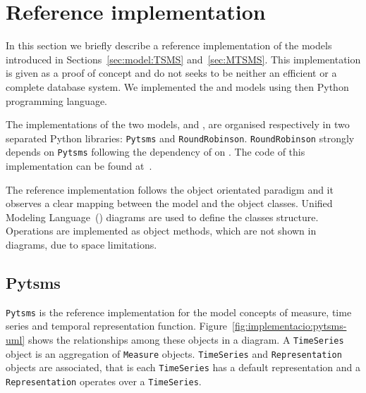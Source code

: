 \section{Reference implementation}
\label{sec:implementation}

In this section we briefly describe a reference implementation of the
models introduced in Sections~\ref{sec:model:TSMS}
and~\ref{sec:MTSMS}. This implementation is given as a proof of
concept and do not seeks to be neither an efficient or a complete database
system. We implemented the  and  models using
then Python~\cite{python:doc2} programming language.

The implementations of the two models,  and ,
are organised respectively in two separated Python libraries:
\texttt{Pytsms} and \texttt{RoundRobinson}.  \texttt{RoundRobinson}
strongly depends on \texttt{Pytsms} following the dependency of
 on .  The code of this implementation can be
found at~\cite{llusa:roundrobinson}.

The reference implementation follows the object orientated paradigm
and it observes a clear mapping between the model and the object
classes. Unified Modeling Language~() diagrams are used to
define the classes structure.  Operations are implemented as object
methods, which are not shown in  diagrams, due to space
limitations.


\subsection{Pytsms}

\texttt{Pytsms} is the reference implementation for the model concepts
of measure, time series and temporal representation function.
Figure~\ref{fig:implementacio:pytsms-uml} shows the relationships
among these objects in a  diagram. A \texttt{TimeSeries}
object is an aggregation of \texttt{Measure}
objects. \texttt{TimeSeries} and \texttt{Representation} objects are
associated, that is each \texttt{TimeSeries} has a default
representation and a \texttt{Representation} operates over a
\texttt{TimeSeries}.

